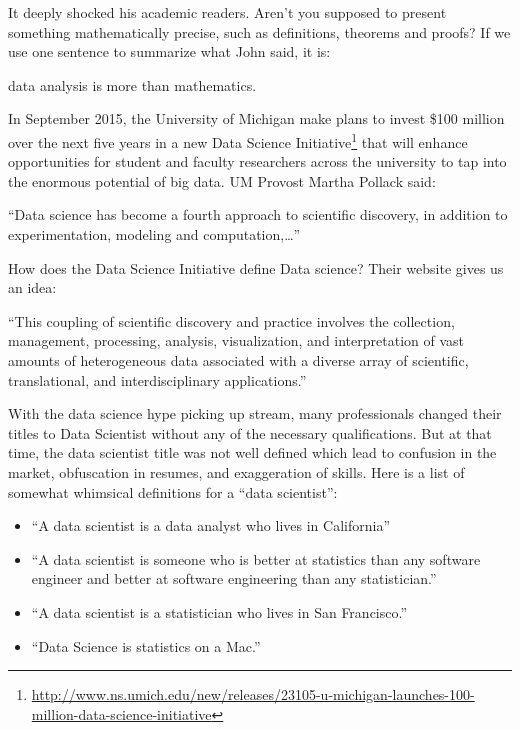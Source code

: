 \documentclass[12pt,]{krantz}
\providecommand{\tightlist}{%
  \setlength{\itemsep}{0pt}\setlength{\parskip}{0pt}}
\renewenvironment{quote}{\begin{VF}}{\end{VF}}
\renewcommand{\href}[2]{#2\footnote{\url{#1}}}
\theoremstyle{definition}
\theoremstyle{definition}
\theoremstyle{remark}
\begin{document}
It deeply shocked his academic readers. Aren't you supposed to present
something mathematically precise, such as definitions, theorems and
proofs? If we use one sentence to summarize what John said, it is:

\begin{quote}
data analysis is more than mathematics.
\end{quote}

In September 2015, the University of Michigan make plans to invest \$100
million over the next five years in a new
\href{http://www.ns.umich.edu/new/releases/23105-u-michigan-launches-100-million-data-science-initiative}{Data
Science Initiative} that will enhance opportunities for student and
faculty researchers across the university to tap into the enormous
potential of big data. UM Provost Martha Pollack said:

\begin{quote}
``Data science has become a fourth approach to scientific discovery, in
addition to experimentation, modeling and computation,\ldots{}''
\end{quote}

How does the Data Science Initiative define Data science? Their website
gives us an idea:

\begin{quote}
``This coupling of scientific discovery and practice involves the
collection, management, processing, analysis, visualization, and
interpretation of vast amounts of heterogeneous data associated with a
diverse array of scientific, translational, and interdisciplinary
applications.''
\end{quote}

With the data science hype picking up stream, many professionals changed
their titles to Data Scientist without any of the necessary
qualifications. But at that time, the data scientist title was not well
defined which lead to confusion in the market, obfuscation in resumes,
and exaggeration of skills. Here is a list of somewhat whimsical
definitions for a ``data scientist'':

\begin{itemize}
\tightlist
\item
  ``A data scientist is a data analyst who lives in California''
\item
  ``A data scientist is someone who is better at statistics than any
  software engineer and better at software engineering than any
  statistician.''
\item
  ``A data scientist is a statistician who lives in San Francisco.''
\item
  ``Data Science is statistics on a Mac.''
\end{itemize}
\end{document}
